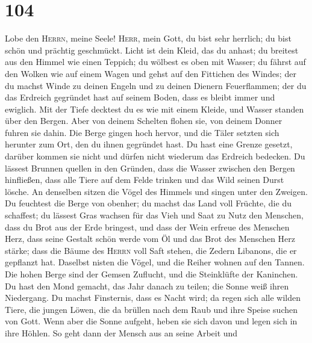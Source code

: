\hypertarget{section-103}{%
\section{104}\label{section-103}}

 Lobe den \textsc{Herrn}, meine Seele! \textsc{Herr}, mein
Gott, du bist sehr herrlich; du bist schön und prächtig geschmückt.
 Licht ist dein Kleid, das du anhast; du breitest aus den
Himmel wie einen Teppich;  du wölbest es oben mit Wasser;
du fährst auf den Wolken wie auf einem Wagen und gehst auf den Fittichen
des Windes;  der du machst Winde zu deinen Engeln und zu
deinen Dienern Feuerflammen;  der du das Erdreich
gegründet hast auf seinem Boden, dass es bleibt immer und ewiglich.
 Mit der Tiefe decktest du es wie mit einem Kleide, und
Wasser standen über den Bergen.  Aber von deinem Schelten
flohen sie, von deinem Donner fuhren sie dahin.  Die Berge
gingen hoch hervor, und die Täler setzten sich herunter zum Ort, den du
ihnen gegründet hast.  Du hast eine Grenze gesetzt,
darüber kommen sie nicht und dürfen nicht wiederum das Erdreich
bedecken.  Du lässest Brunnen quellen in den Gründen,
dass die Wasser zwischen den Bergen hinfließen,  dass
alle Tiere auf dem Felde trinken und das Wild seinen Durst lösche.
 An denselben sitzen die Vögel des Himmels und singen
unter den Zweigen.  Du feuchtest die Berge von obenher;
du machst das Land voll Früchte, die du schaffest;  du
lässest Gras wachsen für das Vieh und Saat zu Nutz den Menschen, dass du
Brot aus der Erde bringest,  und dass der Wein erfreue
des Menschen Herz, dass seine Gestalt schön werde vom Öl und das Brot
des Menschen Herz stärke;  dass die Bäume des
\textsc{Herrn} voll Saft stehen, die Zedern Libanons, die er gepflanzt
hat.  Daselbst nisten die Vögel, und die Reiher wohnen
auf den Tannen.  Die hohen Berge sind der Gemsen
Zuflucht, und die Steinklüfte der Kaninchen.  Du hast den
Mond gemacht, das Jahr danach zu teilen; die Sonne weiß ihren
Niedergang.  Du machst Finsternis, dass es Nacht wird; da
regen sich alle wilden Tiere,  die jungen Löwen, die da
brüllen nach dem Raub und ihre Speise suchen von Gott. 
Wenn aber die Sonne aufgeht, heben sie sich davon und legen sich in ihre
Höhlen.  So geht dann der Mensch aus an seine Arbeit und
